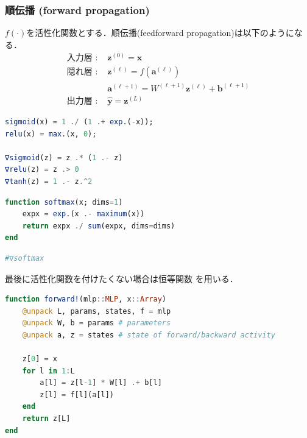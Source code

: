 \subsubsection{順伝播 (forward propagation)}
$f(\cdot)$を活性化関数とする．順伝播(feedforward propagation)は以下のようになる．
\begin{align}
\text{入力層 : }&\mathbf{z}^{(0)}=\mathbf{x}\\
\text{隠れ層 : }&\mathbf{z}^{(\ell)}=f\left(\mathbf{a}^{(\ell)}\right)\\
&\mathbf{a}^{(\ell+1)}=W^{(\ell+1)}\mathbf{z}^{(\ell)}+\mathbf{b}^{(\ell+1)}\\
\text{出力層 : }&\hat{\mathbf{y}}=\mathbf{z}^{(L)}
\end{align}
\begin{lstlisting}[language=julia]
sigmoid(x) = 1 ./ (1 .+ exp.(-x));
relu(x) = max.(x, 0);

∇sigmoid(z) = z .* (1 .- z)
∇relu(z) = z .> 0
∇tanh(z) = 1 .- z.^2
\end{lstlisting}
\begin{lstlisting}[language=julia]
function softmax(x; dims=1)
    expx = exp.(x .- maximum(x))
    return expx ./ sum(expx, dims=dims)
end
\end{lstlisting}
\begin{lstlisting}[language=julia]
#∇softmax
\end{lstlisting}
最後に活性化関数を付けたくない場合は恒等関数  を用いる．
\begin{lstlisting}[language=julia]
function forward!(mlp::MLP, x::Array)
    @unpack L, params, states, f = mlp
    @unpack W, b = params # parameters
    @unpack a, z = states # state of forward/backward activity

    z[0] = x
    for l in 1:L
        a[l] = z[l-1] * W[l] .+ b[l]
        z[l] = f[l](a[l])
    end
    return z[L]
end
\end{lstlisting}
